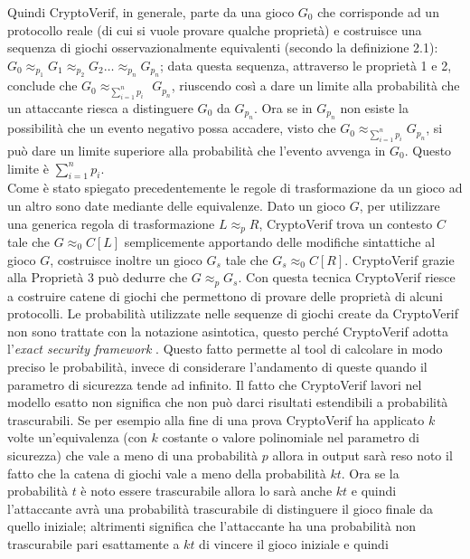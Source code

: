 \documentclass[a4paper,openright,twoside,12pt]{report}
\begin{document}
Quindi CryptoVerif, in generale, parte da una gioco $G_0$ che corrisponde ad un protocollo reale (di cui si vuole provare qualche propriet\`a) e costruisce una sequenza di giochi 
osservazionalmente equivalenti (secondo la definizione 2.1): $G_0 \approx_{p_1} G_1 \approx_{p_2} G_2 \dots \approx_{p_n} G_{p_{n}} $; data questa sequenza, 
attraverso le propriet\`a 1 e 2, conclude che $G_0  \approx_{\sum_{i=1}^{n}{p_i}}$ $G_{p_{n}} $, riuscendo cos\`i a dare un limite alla probabilit\`a che un attaccante riesca a distinguere
$G_0$ da $G_{p_{n}}$. Ora se in $G_{p_{n}}$ non esiste la possibilit\`a che un evento negativo possa accadere, visto che $G_0  \approx_{\sum_{i=1}^{n}{p_i}} G_{p_{n}} $, si pu\`o dare un limite superiore alla probabilit\`a che l'evento avvenga in $G_0$.
Questo limite \`e $\sum_{i=1}^{n}p_i$.\\Come \`e stato spiegato precedentemente le regole di trasformazione da un gioco ad un altro sono date mediante delle equivalenze. 
Dato un gioco $G$, per utilizzare una generica regola di trasformazione  $L \approx_p R$, CryptoVerif trova un contesto $C$ tale che $G \approx_0 C[L] $ semplicemente 
apportando delle modifiche sintattiche al gioco $G$, costruisce inoltre un gioco $G_s$ tale che $G_s \approx_0 C[R]$. CryptoVerif grazie alla Propriet\`a 3 pu\`o dedurre che $G \approx_p G_s$. 
Con questa tecnica CryptoVerif riesce a costruire catene
di giochi che permettono di provare delle propriet\`a di alcuni protocolli.
Le probabilit\`a utilizzate nelle sequenze di giochi create da CryptoVerif non sono trattate con la notazione asintotica, questo perch\'e
CryptoVerif adotta l'\emph{exact security framework} \cite{BellareR96}. Questo fatto permette al tool di calcolare in modo preciso le probabilit\`a, invece di 
considerare l'andamento di queste quando il parametro di sicurezza tende ad infinito.
Il fatto che CryptoVerif lavori nel modello esatto non significa che non pu\`o darci risultati estendibili a probabilit\`a trascurabili.
Se per esempio alla fine di una prova CryptoVerif ha applicato $k$ volte un'equivalenza (con $k$ costante o valore polinomiale nel parametro di sicurezza) che vale a meno di una probabilit\`a $p$ allora
in output sar\`a reso noto il fatto che la catena di giochi vale a meno della probabilit\`a $kt$. Ora se la probabilit\`a $t$ \`e noto essere
trascurabile allora lo sar\`a anche $kt$ e quindi l'attaccante avr\`a una probabilit\`a trascurabile di distinguere il gioco finale da quello iniziale; 
altrimenti significa che l'attaccante ha una probabilit\`a non trascurabile pari esattamente a $kt$ di vincere il gioco iniziale e quindi
\end{document}
